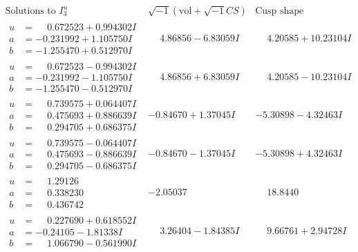 \documentclass[1p]{elsarticle_modified}
\theoremstyle{definition}
\newcommand{\I}{\sqrt{-1}}
\begin{document}
$$\begin{array}{c|c|c}  
\text{Solutions to }I^u_{3}& \I (\text{vol} + \sqrt{-1}CS) & \text{Cusp shape}\\
 \hline 
\begin{aligned}
u &= \phantom{-}0.672523 + 0.994302 I \\
a &= -0.231992 + 1.105750 I \\
b &= -1.255470 + 0.512970 I\end{aligned}
 & \phantom{-}4.86856 - 6.83059 I & \phantom{-}4.20585 + 10.23104 I \\ \hline\begin{aligned}
u &= \phantom{-}0.672523 - 0.994302 I \\
a &= -0.231992 - 1.105750 I \\
b &= -1.255470 - 0.512970 I\end{aligned}
 & \phantom{-}4.86856 + 6.83059 I & \phantom{-}4.20585 - 10.23104 I \\ \hline\begin{aligned}
u &= \phantom{-}0.739575 + 0.064407 I \\
a &= \phantom{-}0.475693 + 0.886639 I \\
b &= \phantom{-}0.294705 + 0.686375 I\end{aligned}
 & -0.84670 + 1.37045 I & -5.30898 - 4.32463 I \\ \hline\begin{aligned}
u &= \phantom{-}0.739575 - 0.064407 I \\
a &= \phantom{-}0.475693 - 0.886639 I \\
b &= \phantom{-}0.294705 - 0.686375 I\end{aligned}
 & -0.84670 - 1.37045 I & -5.30898 + 4.32463 I \\ \hline\begin{aligned}
u &= \phantom{-}1.29126\phantom{ +0.000000I} \\
a &= \phantom{-}0.338230\phantom{ +0.000000I} \\
b &= \phantom{-}0.436742\phantom{ +0.000000I}\end{aligned}
 & -2.05037\phantom{ +0.000000I} & \phantom{-}18.8440\phantom{ +0.000000I} \\ \hline\begin{aligned}
u &= \phantom{-}0.227690 + 0.618552 I \\
a &= -0.24105 - 1.81338 I \\
b &= \phantom{-}1.066790 - 0.561990 I\end{aligned}
 & \phantom{-}3.26404 - 1.84385 I & \phantom{-}9.66761 + 2.94728 I \\ \hline\begin{aligned}

\end{aligned}
\end{array}$$
\end{document}
